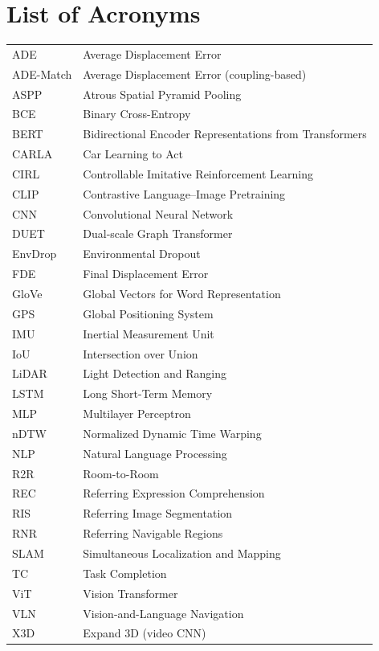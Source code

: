 \documentclass[11pt]{book}
\begin{document}
\chapter*{List of Acronyms}
\begin{center}
\begin{tabular}{@{}ll@{}}
ADE & Average Displacement Error \\
ADE-Match & Average Displacement Error (coupling-based) \\
ASPP & Atrous Spatial Pyramid Pooling \\
BCE & Binary Cross-Entropy \\
BERT & Bidirectional Encoder Representations from Transformers \\
CARLA & Car Learning to Act \\
CIRL & Controllable Imitative Reinforcement Learning \\
CLIP & Contrastive Language--Image Pretraining \\
CNN & Convolutional Neural Network \\
DUET & Dual-scale Graph Transformer \\
EnvDrop & Environmental Dropout \\
FDE & Final Displacement Error \\
GloVe & Global Vectors for Word Representation \\
GPS & Global Positioning System \\
IMU & Inertial Measurement Unit \\
IoU & Intersection over Union \\
LiDAR & Light Detection and Ranging \\
LSTM & Long Short-Term Memory \\
MLP & Multilayer Perceptron \\
nDTW & Normalized Dynamic Time Warping \\
NLP & Natural Language Processing \\
R2R & Room-to-Room \\
REC & Referring Expression Comprehension \\
RIS & Referring Image Segmentation \\
RNR & Referring Navigable Regions \\
SLAM & Simultaneous Localization and Mapping \\
TC & Task Completion \\
ViT & Vision Transformer \\
VLN & Vision-and-Language Navigation \\
X3D & Expand 3D (video CNN) \\
\end{tabular}
\end{center}
\end{document}
